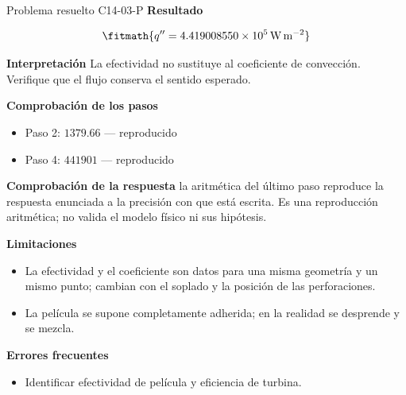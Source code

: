 \documentclass[10pt,openany]{book}
\begin{document}
\begin{studiumworked}{Problema resuelto C14-03-P}
\noindent\textbf{Resultado}

\[
\fitmath{q''=4.419008550\times10^{5}\,\mathrm{W}\,\mathrm{m}^{-2}}
\]

\noindent\textbf{Interpretación}
La efectividad no sustituye al coeficiente de convección. Verifique que el flujo conserva el sentido esperado.

\noindent\textbf{Comprobación de los pasos}
\begin{itemize}
\item Paso 2: $1379.66$ — reproducido
\item Paso 4: $441901$ — reproducido
\end{itemize}

\noindent\textbf{Comprobación de la respuesta} la aritmética del último paso reproduce la respuesta enunciada a la precisión con que está escrita. Es una reproducción aritmética; no valida el modelo físico ni sus hipótesis.

\noindent\textbf{Limitaciones}
\begin{itemize}
\item La efectividad y el coeficiente son datos para una misma geometría y un mismo punto; cambian con el soplado y la posición de las perforaciones.
\item La película se supone completamente adherida; en la realidad se desprende y se mezcla.
\end{itemize}

\noindent\textbf{Errores frecuentes}
\begin{itemize}
\item Identificar efectividad de película y eficiencia de turbina.
\end{itemize}
\end{studiumworked}
\end{document}
